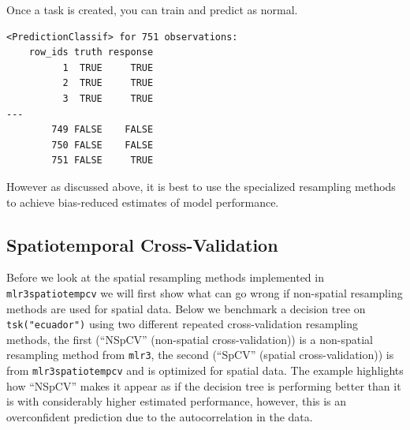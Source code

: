 Once a task is created, you can train and predict as normal.

\begin{Shaded}
\begin{Highlighting}[]
\NormalTok{(}\NormalTok{)}\SpecialCharTok{$}\SpecialCharTok{$}
\end{Highlighting}
\end{Shaded}

\begin{verbatim}
<PredictionClassif> for 751 observations:
    row_ids truth response
          1  TRUE     TRUE
          2  TRUE     TRUE
          3  TRUE     TRUE
---                       
        749 FALSE    FALSE
        750 FALSE    FALSE
        751 FALSE     TRUE
\end{verbatim}

However as discussed above, it is best to use the specialized resampling
methods to achieve bias-reduced estimates of model performance.

\hypertarget{spatiotemp-cv}{%
\subsection{Spatiotemporal Cross-Validation}\label{spatiotemp-cv}}

Before we look at the spatial resampling methods implemented in
\texttt{mlr3spatiotempcv} we will first show what can go wrong if
non-spatial resampling methods are used for spatial data. Below we
benchmark a decision tree on \texttt{tsk("ecuador")} using two different
repeated cross-validation resampling methods, the first (``NSpCV''
(non-spatial cross-validation)) is a non-spatial resampling method from
\texttt{mlr3}, the second (``SpCV'' (spatial cross-validation)) is from
\texttt{mlr3spatiotempcv} and is optimized for spatial data. The example
highlights how ``NSpCV'' makes it appear as if the decision tree is
performing better than it is with considerably higher estimated
performance, however, this is an overconfident prediction due to the
autocorrelation in the data.


